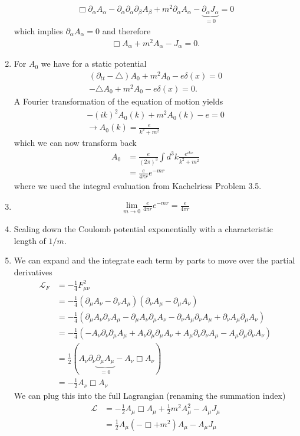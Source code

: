 \documentclass[10pt,a4paper]{article}
\theoremstyle{definition}
\begin{document}
\begin{enumerate}
\begin{align}
    \Box \partial_\alpha A_\alpha-\partial_\alpha\partial_\alpha\partial_\beta A_\beta+m^2\partial_\alpha A_\alpha-\underbrace{\partial_\alpha J_\alpha}_{=0}=0
\end{align}
which implies $\partial_\alpha A_\alpha=0$ and therefore
\begin{align}
    \Box A_\alpha+m^2A_\alpha-J_\alpha=0.
\end{align}
\item For $A_0$ we have for a static potential
\begin{align}
    (\partial_{tt}-\triangle)A_0+m^2A_0-e\delta(x)=0\\
    -\triangle A_0+m^2A_0-e\delta(x)=0.
\end{align}
A Fourier transformation of the equation of motion yields
\begin{align}
    -(ik)^2 A_0(k)+m^2A_0(k)-e=0\\
    \rightarrow A_0(k)=\frac{e}{k^2+m^2}
\end{align}
which we can now transform back 
\begin{align}
    A_0
    &=\frac{e}{(2\pi)^3}\int d^3k\frac{e^{ikx}}{k^2+m^2}\\
    &=\frac{e}{4\pi r} e^{-mr}
\end{align}
where we used the integral evaluation from {\sc Kachelriess} Problem 3.5.
\item 
\begin{align}
    \lim_{m\rightarrow0}\frac{e}{4\pi r} e^{-mr}=\frac{e}{4\pi r}
\end{align}
\item Scaling down the Coulomb potential exponentially with a characteristic length of $1/m$.
\item We can expand and the integrate each term by parts to move over the partial derivatives 
\begin{align}
    \mathscr{L}_F
    &=-\frac{1}{4}F_{\mu\nu}^2\\
    &=-\frac{1}{4}(\partial_\mu A_\nu-\partial_\nu A_\mu)(\partial_\nu A_\mu-\partial_\mu A_\nu)\\
    &=-\frac{1}{4}\left(\partial_\mu A_\nu \partial_\nu A_\mu-\partial_\mu A_\nu \partial_\mu A_\nu
        -\partial_\nu A_\mu \partial_\nu A_\mu + \partial_\nu A_\mu\partial_\mu A_\nu\right)\\
    &=-\frac{1}{4}\left(- A_\nu \partial_\nu \partial_\mu A_\mu+ A_\nu \partial_\mu\partial_\mu A_\nu
        + A_\mu \partial_\nu\partial_\nu A_\mu -  A_\mu\partial_\mu \partial_\nu A_\nu\right)\\
    &=\frac{1}{2}\left( A_\nu \partial_\nu \underbrace{\partial_\mu A_\mu}_{=0}- A_\nu \Box A_\nu\right)\\ 
    &=-\frac{1}{2}A_\nu \Box A_\nu
\end{align}
We can plug this into the full Lagrangian (renaming the summation index)
\begin{align}
    \mathscr{L}&=-\frac{1}{2}A_\mu \Box A_\mu+\frac{1}{2}m^2A_\mu^2-A_\mu J_\mu\\
    &=\frac{1}{2}A_\mu\left(-\Box+m^2 \right)A_\mu-A_\mu J_\mu\\
\end{align}    
\end{enumerate}
\end{document}
